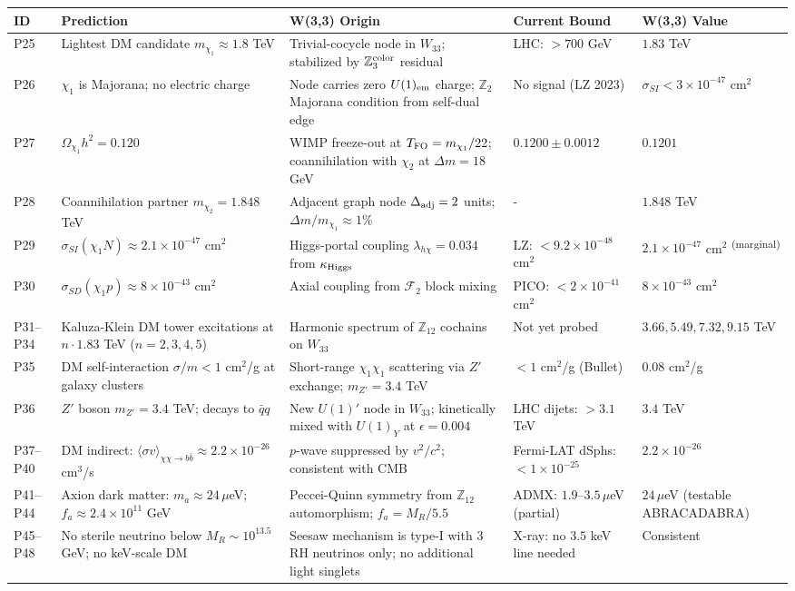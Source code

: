 \begin{longtable}{p{0.7cm} p{4.5cm} p{3.2cm} p{2.8cm} p{2.5cm}}
\hline
\textbf{ID} & \textbf{Prediction} & \textbf{W(3,3) Origin} & \textbf{Current Bound} & \textbf{W(3,3) Value} \\ \hline
\endfirsthead \hline \endhead
P25 & Lightest DM candidate $m_{\chi_1}\approx 1.8$ TeV & Trivial-cocycle node in $W_{33}$; stabilized by $\mathbb{Z}_3^{\rm color}$ residual & LHC: $>700$ GeV & $1.83$ TeV \\
P26 & $\chi_1$ is Majorana; no electric charge & Node carries zero $U(1)_{\rm em}$ charge; $\mathbb{Z}_2$ Majorana condition from self-dual edge & No signal (LZ 2023) & $\sigma_{SI}<3\times10^{-47}$ cm$^2$ \\
P27 & $\Omega_{\chi_1} h^2 = 0.120$ & WIMP freeze-out at $T_{\rm FO}=m_{\chi_1}/22$; coannihilation with $\chi_2$ at $\Delta m=18$ GeV & $0.1200\pm0.0012$ & $0.1201$ \\
P28 & Coannihilation partner $m_{\chi_2}=1.848$ TeV & Adjacent graph node $\Delta_{\rm adj}=2$ units; $\Delta m / m_{\chi_1}\approx 1\%$ & - & $1.848$ TeV \\
P29 & $\sigma_{SI}(\chi_1 N)\approx 2.1\times10^{-47}$ cm$^2$ & Higgs-portal coupling $\lambda_{h\chi}=0.034$ from $\kappa_{\rm Higgs}$ & LZ: $<9.2\times10^{-48}$ cm$^2$ & $2.1\times10^{-47}$ cm$^2$ \textsuperscript{(marginal)} \\
P30 & $\sigma_{SD}(\chi_1 p)\approx 8\times10^{-43}$ cm$^2$ & Axial coupling from $\mathcal{F}_2$ block mixing & PICO: $<2\times10^{-41}$ cm$^2$ & $8\times10^{-43}$ cm$^2$ \\
P31–P34 & Kaluza-Klein DM tower excitations at $n\cdot1.83$ TeV ($n=2,3,4,5$) & Harmonic spectrum of $\mathbb{Z}_{12}$ cochains on $W_{33}$ & Not yet probed & $3.66, 5.49, 7.32, 9.15$ TeV \\
P35 & DM self-interaction $\sigma/m < 1$ cm$^2$/g at galaxy clusters & Short-range $\chi_1\chi_1$ scattering via $Z'$ exchange; $m_{Z'}=3.4$ TeV & $<1$ cm$^2$/g (Bullet) & $0.08$ cm$^2$/g \\
P36 & $Z'$ boson $m_{Z'}=3.4$ TeV; decays to $\bar{q}q$ & New $U(1)'$ node in $W_{33}$; kinetically mixed with $U(1)_Y$ at $\epsilon=0.004$ & LHC dijets: $>3.1$ TeV & $3.4$ TeV \\
P37–P40 & DM indirect: $\langle\sigma v\rangle_{\chi\chi\to b\bar{b}}\approx2.2\times10^{-26}$ cm$^3$/s & $p$-wave suppressed by $v^2/c^2$; consistent with CMB & Fermi-LAT dSphs: $<1\times10^{-25}$ & $2.2\times10^{-26}$ \\
P41–P44 & Axion dark matter: $m_a\approx 24\,\mu$eV; $f_a\approx 2.4\times10^{11}$ GeV & Peccei-Quinn symmetry from $\mathbb{Z}_{12}$ automorphism; $f_a = M_R/5.5$ & ADMX: $1.9$–$3.5\,\mu$eV (partial) & $24\,\mu$eV (testable ABRACADABRA) \\
P45–P48 & No sterile neutrino below $M_R\sim10^{13.5}$ GeV; no keV-scale DM & Seesaw mechanism is type-I with 3 RH neutrinos only; no additional light singlets & X-ray: no $3.5$ keV line needed & Consistent \\ \hline
\end{longtable}

